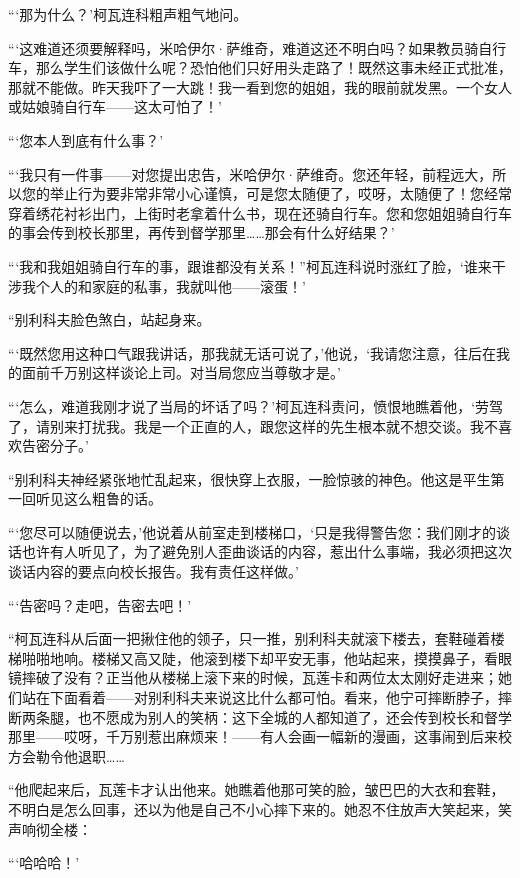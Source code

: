 \documentclass[12pt,UTF-8,openany]{ctexbook}
\begin{document}
\begin{large}
    “‘那为什么？’柯瓦连科粗声粗气地问。
    
    “‘这难道还须要解释吗，米哈伊尔·萨维奇，难道这还不明白吗？如果教员骑自行车，那么学生们该做什么呢？恐怕他们只好用头走路了！既然这事未经正式批准，那就不能做。昨天我吓了一大跳！我一看到您的姐姐，我的眼前就发黑。一个女人或姑娘骑自行车——这太可怕了！’
    
    “‘您本人到底有什么事？’
    
    “‘我只有一件事——对您提出忠告，米哈伊尔·萨维奇。您还年轻，前程远大，所以您的举止行为要非常非常小心谨慎，可是您太随便了，哎呀，太随便了！您经常穿着绣花衬衫出门，上街时老拿着什么书，现在还骑自行车。您和您姐姐骑自行车的事会传到校长那里，再传到督学那里……那会有什么好结果？’
    
    “‘我和我姐姐骑自行车的事，跟谁都没有关系！”柯瓦连科说时涨红了脸，‘谁来干涉我个人的和家庭的私事，我就叫他——滚蛋！’
    
    “别利科夫脸色煞白，站起身来。
    
    “‘既然您用这种口气跟我讲话，那我就无话可说了，’他说，‘我请您注意，往后在我的面前千万别这样谈论上司。对当局您应当尊敬才是。’
    
    “‘怎么，难道我刚才说了当局的坏话了吗？’柯瓦连科责问，愤恨地瞧着他，‘劳驾了，请别来打扰我。我是一个正直的人，跟您这样的先生根本就不想交谈。我不喜欢告密分子。’
    
    “别利科夫神经紧张地忙乱起来，很快穿上衣服，一脸惊骇的神色。他这是平生第一回听见这么粗鲁的话。
    
    “‘您尽可以随便说去，’他说着从前室走到楼梯口，‘只是我得警告您：我们刚才的谈话也许有人听见了，为了避免别人歪曲谈话的内容，惹出什么事端，我必须把这次谈话内容的要点向校长报告。我有责任这样做。’
    
    “‘告密吗？走吧，告密去吧！’
    
    “柯瓦连科从后面一把揪住他的领子，只一推，别利科夫就滚下楼去，套鞋碰着楼梯啪啪地响。楼梯又高又陡，他滚到楼下却平安无事，他站起来，摸摸鼻子，看眼镜摔破了没有？正当他从楼梯上滚下来的时候，瓦莲卡和两位太太刚好走进来；她们站在下面看着——对别利科夫来说这比什么都可怕。看来，他宁可摔断脖子，摔断两条腿，也不愿成为别人的笑柄：这下全城的人都知道了，还会传到校长和督学那里——哎呀，千万别惹出麻烦来！——有人会画一幅新的漫画，这事闹到后来校方会勒令他退职……
    
    “他爬起来后，瓦莲卡才认出他来。她瞧着他那可笑的脸，皱巴巴的大衣和套鞋，不明白是怎么回事，还以为他是自己不小心摔下来的。她忍不住放声大笑起来，笑声响彻全楼：
    
    “‘哈哈哈！’
    

\end{large}
\end{document}
